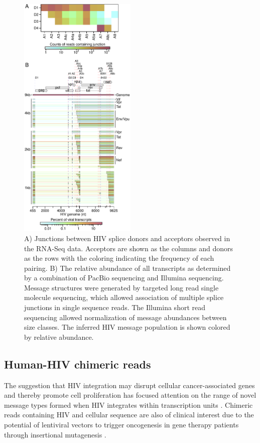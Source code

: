 \documentclass[../sherrill-Mix_thesis.tex]{subfiles}
\begin{document}
		\begin{figure}
			\centering
				\includegraphics[width=0.5\textwidth]{comboHiv.pdf}
			\caption[Transcription and splicing of the \hivEight{} RNA.]{  A) Junctions between HIV splice donors and acceptors observed in the RNA-Seq data. Acceptors are shown as the columns and donors as the rows with the coloring indicating the frequency of each pairing.   B) The relative abundance of all \hivEight{} transcripts as determined by a combination of PacBio sequencing \citep{Ocwieja2012} and Illumina sequencing. Message structures were generated by targeted long read single molecule sequencing, which allowed association of multiple splice junctions in single sequence reads. The Illumina short read sequencing allowed normalization of message abundances between size classes. The inferred HIV message population is shown colored by relative abundance.} 
			\label{figHiv}
		\end{figure}

	\subsection{Human-HIV chimeric reads} %
		The suggestion that HIV integration may disrupt cellular cancer-associated genes and thereby promote cell proliferation \citep{Ikeda2007,Wagner2014,Maldarelli2014,Cohn2015} has focused attention on the range of novel message types formed when HIV integrates within transcription units \citep{Schroder2002,Wang2007,Brady2009,Sherrill-Mix2013,Marini2015}. Chimeric reads containing HIV and cellular sequence are also of clinical interest due to the potential of lentiviral vectors to trigger oncogenesis in gene therapy patients through insertional mutagenesis \citep{Cavazzana-Calvo2010,Hacein-Bey-Abina2008,Moiani2012,Cesana2012}. 
		
\end{document}
